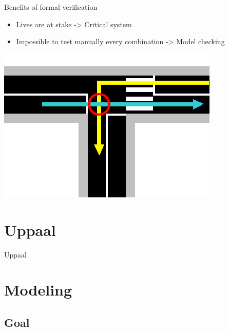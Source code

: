 \documentclass{bredelebeamer}
\begin{document}




\begin{frame}{Benefits of formal verification}
 \begin{itemize}
\item Lives are at stake -> Critical system
\item Impossible to test manually every combination -> Model checking
\end{itemize}
\centering
\includegraphics[scale=0.4]{images/exempleCollision.png}
\end{frame}


\section{Uppaal}
\begin{frame}{Uppaal}
\end{frame}

\section{Modeling}

\subsection{Goal}
\end{document}
